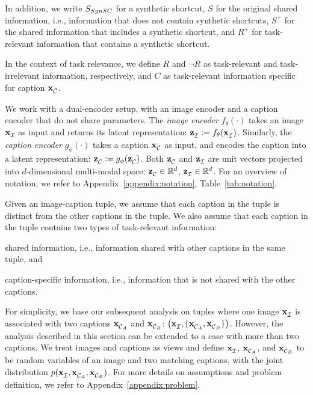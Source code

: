 In addition, we write
$S_{SynSC}{}$ for a synthetic shortcut,
$S$ for the original shared information, i.e., information that does not contain synthetic shortcuts,
$S^{+}$ for the shared information that includes a synthetic shortcut,
and $R^{+}$ for task-relevant information that contains a synthetic shortcut.

In the context of task relevance, we define $R$ and $\neg R$ as task-relevant and task-irrelevant information, respectively, and $C$ as task-relevant information specific for caption $\mathbf{x}_{\mathcal{C}_{}}^{}$.

We work with a dual-encoder setup, with an image encoder and a caption encoder that do not share parameters. 
The \emph{image encoder} $f_{\theta}(\cdot)$ takes an image $\mathbf{x}_{\mathcal{I}}^{}$ as input and returns its latent representation: $\mathbf{z}_{\mathcal{I}_{}}^{} :=  f_{\theta}(\mathbf{x}_{\mathcal{I}}^{})$.
Similarly, the \emph{caption encoder} $g_{\phi}(\cdot)$ takes a caption $\mathbf{x}_{\mathcal{C}_{}}^{}$ as input, and encodes the caption into a latent representation: $\mathbf{z}_{\mathcal{C}_{}}^{} :=  g_{\phi}(\mathbf{z}_{\mathcal{C}_{}}^{})$. 
Both $\mathbf{z}_{\mathcal{C}_{}}^{}$ and $\mathbf{z}_{\mathcal{I}_{}}^{}$ are unit vectors projected into $d$-dimensional multi-modal space: $\mathbf{z}_{\mathcal{C}_{}}^{} \in {\mathbb{R}}^d$, $\mathbf{z}_{\mathcal{I}_{}}^{} \in {\mathbb{R}}^d$.
For an overview of notation, we refer to Appendix~\ref{appendix:notation}, Table~\ref{tab:notation}.

Given an image-caption tuple, 
we assume that each caption in the tuple is distinct from the other captions in the tuple.
We also assume that each caption in the tuple contains two types of task-relevant information:
\begin{enumerate*}[label=(\roman*)]
	\item shared information, i.e., information shared with other captions in the same tuple,
	and 
	\item caption-specific information, i.e., information that is not shared with the other captions.
\end{enumerate*}
For simplicity, we base our subsequent analysis on tuples where one image $\mathbf{x}_{\mathcal{I}}^{}{}$ is associated with two captions $\mathbf{x}_{\mathcal{C}_{A}}^{}$ and $\mathbf{x}_{\mathcal{C}_{B}}^{}$: $\left(\mathbf{x}_{\mathcal{I}}^{}, \{\mathbf{x}_{\mathcal{C}_{A}}^{}, \mathbf{x}_{\mathcal{C}_{B}}^{}\} \right)$. 
However, the analysis described in this section can be extended to a case with more than two captions. We treat images and captions as views and define  $\mathbf{x}_{\mathcal{I}}^{}{}$, $\mathbf{x}_{\mathcal{C}_{A}}^{}$, and $\mathbf{x}_{\mathcal{C}_{B}}^{}$ to be random variables of an image and two matching captions, with the joint distribution $p(\mathbf{x}_{\mathcal{I}}^{}{}, \mathbf{x}_{\mathcal{C}_{A}}^{}, \mathbf{x}_{\mathcal{C}_{B}}^{})$.
For more details on assumptions and problem definition, we refer to Appendix~\ref{appendix:problem}.

